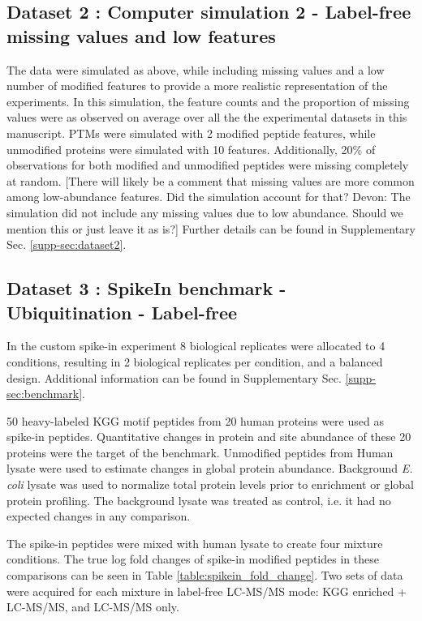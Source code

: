 \documentclass[mcp]{article}
\numberwithin{table}{section}
\def\todo#1{{\color{red}[#1]}}
\begin{document}
\subsection*{Dataset 2 : Computer simulation 2 - Label-free missing values and low features}
\label{sec:comp_sim_procedure2}

The data were simulated as above, while including missing values and a low number of modified features to provide a more realistic representation of the experiments. In this simulation, the feature counts and the proportion of missing values were as observed on average over all the the experimental datasets in this manuscript. PTMs were simulated with 2 modified peptide features, while unmodified proteins were simulated with 10 features. Additionally, 20\% of observations for both modified and unmodified peptides were missing completely at random. \todo{There will likely be a comment that missing values are more common among low-abundance features. Did the simulation account for that? Devon: The simulation did not include any missing values due to low abundance. Should we mention this or just leave it as is?} Further details can be found in Supplementary Sec. \ref{supp-sec:dataset2}.
 
\subsection*{Dataset 3 : SpikeIn benchmark - Ubiquitination - Label-free}
\label{sec:exp_proc_dataset3}

In the custom spike-in experiment 8 biological replicates were allocated to 4 conditions, resulting in 2 biological replicates per condition, and a balanced design. Additional information can be found in Supplementary Sec. \ref{supp-sec:benchmark}. 


\medskip {} 50 heavy-labeled KGG motif peptides from 20 human proteins were used as spike-in peptides. Quantitative changes in protein and site abundance of these 20 proteins were the target of the benchmark.  Unmodified peptides from Human lysate were used to estimate changes in global protein abundance. Background {\it E. coli} lysate was used to normalize total protein levels prior to enrichment or global protein profiling. The background lysate was treated as control, i.e. it had no expected changes in any comparison. 

The spike-in peptides were mixed with human lysate to create four mixture conditions. The true log fold changes of spike-in modified peptides in these comparisons can be seen in Table \ref{table:spikein_fold_change}.  Two sets of data were acquired for each mixture in label-free LC-MS/MS mode: KGG enriched + LC-MS/MS, and LC-MS/MS only.
\end{document}
